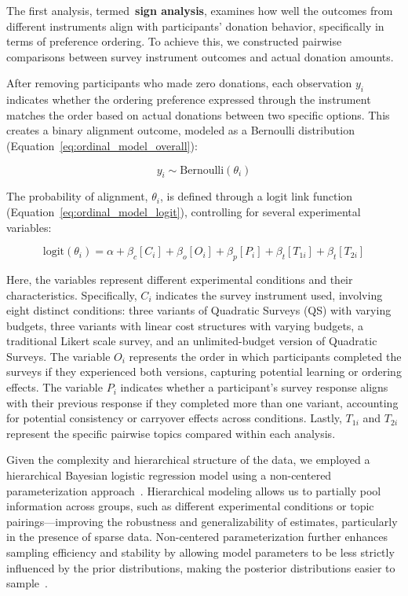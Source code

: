 The first analysis, termed~\textbf{sign analysis}, examines how well the outcomes from different instruments align with participants' donation behavior, specifically in terms of preference ordering. To achieve this, we constructed pairwise comparisons between survey instrument outcomes and actual donation amounts.

After removing participants who made zero donations, each observation $y_i$ indicates whether the ordering preference expressed through the instrument matches the order based on actual donations between two specific options. This creates a binary alignment outcome, modeled as a Bernoulli distribution (Equation~\ref{eq:ordinal_model_overall}):

\begin{equation}
    \label{eq:ordinal_model_overall}
    y_i \sim \text{Bernoulli}(\theta_i)
\end{equation}

The probability of alignment, $\theta_i$, is defined through a logit link function (Equation~\ref{eq:ordinal_model_logit}), controlling for several experimental variables:

\begin{equation}
    \label{eq:ordinal_model_logit}
    \text{logit}(\theta_i) = \alpha + \beta_c[C_i] + \beta_o[O_i] + \beta_p[P_i] + \beta_t[T_{1i}] + \beta_t[T_{2i}]
\end{equation}

Here, the variables represent different experimental conditions and their characteristics. Specifically, $C_i$ indicates the survey instrument used, involving eight distinct conditions: three variants of Quadratic Surveys (QS) with varying budgets, three variants with linear cost structures with varying budgets, a traditional Likert scale survey, and an unlimited-budget version of Quadratic Surveys. The variable $O_i$ represents the order in which participants completed the surveys if they experienced both versions, capturing potential learning or ordering effects. The variable $P_i$ indicates whether a participant's survey response aligns with their previous response if they completed more than one variant, accounting for potential consistency or carryover effects across conditions. Lastly, $T_{1i}$ and $T_{2i}$ represent the specific pairwise topics compared within each analysis.


Given the complexity and hierarchical structure of the data, we employed a hierarchical Bayesian logistic regression model using a non-centered parameterization approach~\cite{mcelreath2018statistical}. Hierarchical modeling allows us to partially pool information across groups, such as different experimental conditions or topic pairings—improving the robustness and generalizability of estimates, particularly in the presence of sparse data. Non-centered parameterization further enhances sampling efficiency and stability by allowing model parameters to be less strictly influenced by the prior distributions, making the posterior distributions easier to sample~\cite{mcelreath2018statistical}.

